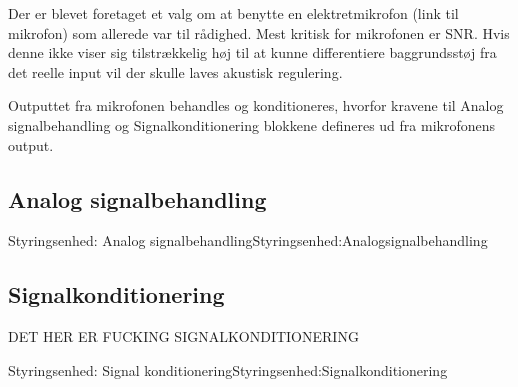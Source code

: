 {Der er blevet foretaget et valg om at benytte en elektretmikrofon \tbr (link til mikrofon) som allerede var til rådighed. 
Mest kritisk for mikrofonen er SNR\cite{Lewis2012}. Hvis denne ikke viser sig tilstrækkelig høj til at kunne differentiere baggrundsstøj fra det reelle input vil der skulle laves akustisk regulering.

Outputtet fra mikrofonen behandles og konditioneres, hvorfor kravene til Analog signalbehandling og Signalkonditionering blokkene defineres ud fra mikrofonens output.

\subsection{Analog signalbehandling}
\begin{PartBlokDescription}{Styringsenhed: Analog signalbehandling}{Styringsenhed:Analogsignalbehandling}
\end{PartBlokDescription}







\subsection{Signalkonditionering}
DET HER ER FUCKING SIGNALKONDITIONERING

\begin{PartBlokDescription}{Styringsenhed: Signal konditionering}{Styringsenhed:Signalkonditionering}
\end{PartBlokDescription}

}
